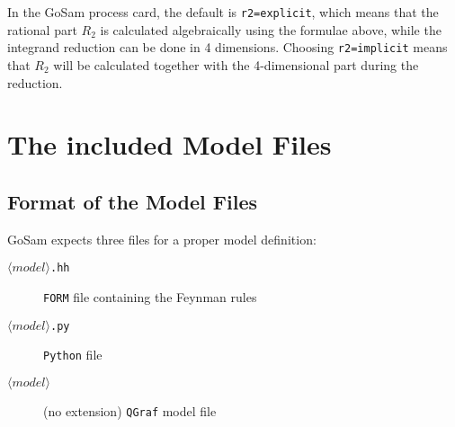 \documentclass[11pt,a4paper]{refrep}
\newcommand{\gosamversion}{{2{.}0}}
\newcommand{\gosam}{{\sc GoSam}\xspace}
\newcommand{\gosamv}[1][\gosamversion]{{\sc GoSam}\xspace}
\newcommand{\qgraf}{{\tt QGraf}\xspace}
\newcommand{\form}{{\tt FORM}\xspace}
\newcommand{\python}{{\tt Python}\xspace}
\begin{document}
In the \gosam{} process card, the default is {\tt r2=explicit}, which means that 
the rational part $R_2$ is calculated algebraically using the formulae above, 
while the integrand reduction can be done in 4 dimensions.
Choosing {\tt r2=implicit} means that $R_2$ will be calculated together with the 4-dimensional 
part during the reduction.

\chapter{The included Model Files}
\label{chp:model-files}

\section{Format of the Model Files}\label{sec:modelfiles}
\gosamv{} expects three files for a proper model definition:
\begin{description}
\item[$\langle model\rangle$\texttt{.hh}] \form{} file containing the Feynman rules
\item[$\langle model\rangle$\texttt{.py}] \python{} file
\item[$\langle model\rangle$] (no extension) \qgraf{} model file
\end{description}
\end{document}
